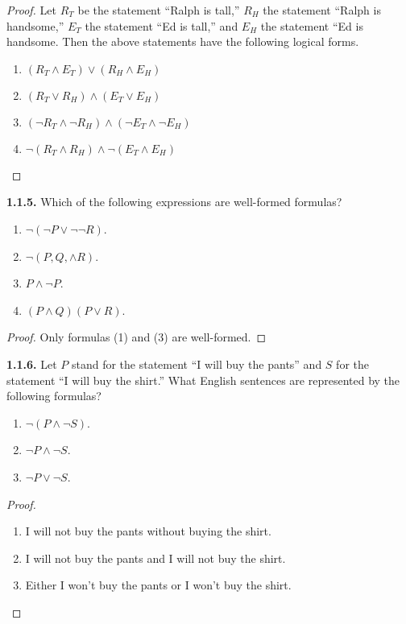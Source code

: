 \documentclass[12pt]{amsart}
\newenvironment{statement}[1]{\smallskip\noindent\color[rgb]{.6627, .3529, .6314} {\bf #1.}}{}
\theoremstyle{definition}
\theoremstyle{remark}
\begin{document}
\begin{proof}
Let $R_T$ be the statement ``Ralph is tall,'' $R_H$ the statement ``Ralph is handsome,'' $E_T$ the statement ``Ed is tall,'' and $E_H$ the statement ``Ed is handsome.
Then the above statements have the following logical forms.
\begin{enumerate}
	\item $(R_T \wedge E_T) \vee (R_H \wedge E_H)$
	\item $(R_T \vee R_H) \wedge (E_T \vee E_H)$
	\item $(\neg R_T \wedge \neg R_H) \wedge (\neg E_T \wedge \neg E_H)$
	\item $\neg (R_T \wedge R_H) \wedge \neg (E_T \wedge E_H)$
\end{enumerate}
\end{proof}


\begin{statement}{1.1.5}
Which of the following expressions are well-formed formulas?
\begin{enumerate}
	\item $\neg ( \neg P \vee \neg \neg R )$.
	\item $\neg ( P, Q, \wedge R )$.
	\item $P \wedge \neg P$.
	\item $(P \wedge Q)(P \vee R)$.
\end{enumerate}
\end{statement}

\begin{proof}
Only formulas (1) and (3) are well-formed.
\end{proof}


\begin{statement}{1.1.6}
Let $P$ stand for the statement ``I will buy the pants'' and $S$ for the statement ``I will buy the shirt.''
What English sentences are represented by the following formulas?
\begin{enumerate}
	\item $\neg (P \wedge \neg S)$.
	\item $\neg P \wedge \neg S$.
	\item $\neg P \vee \neg S$.
\end{enumerate}
\end{statement}

\begin{proof}
\hfill
\begin{enumerate}
	\item I will not buy the pants without buying the shirt.
	\item I will not buy the pants and I will not buy the shirt.
	\item Either I won't buy the pants or I won't buy the shirt.
\end{enumerate}
\end{proof}
\end{document}
